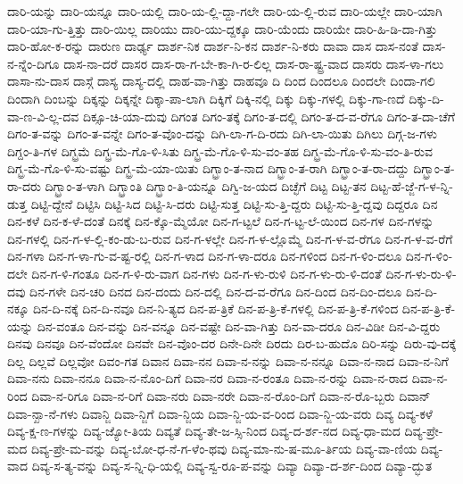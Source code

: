 {ದಾರಿ-ಯನ್ನು
ದಾರಿ-ಯನ್ನೂ
ದಾರಿ-ಯಲ್ಲಿ
ದಾರಿ-ಯ-ಲ್ಲಿ-ದ್ದಾ-ಗಲೇ
ದಾರಿ-ಯ-ಲ್ಲಿ-ರುವ
ದಾರಿ-ಯಲ್ಲೇ
ದಾರಿ-ಯಾಗಿ
ದಾರಿ-ಯಾ-ಗು-ತ್ತಿತ್ತು
ದಾರಿ-ಯಿಲ್ಲ
ದಾರಿಯು
ದಾರಿ-ಯು-ದ್ದಕ್ಕೂ
ದಾರಿ-ಯೆಂದು
ದಾರಿಯೇ
ದಾರಿ-ಹಿ-ಡಿ-ದಾ-ಗಿತ್ತು
ದಾರಿ-ಹೋ-ಕ-ರನ್ನು
ದಾರುಣ
ದಾರ್ಢ್ಯ
ದಾರ್ಶ-ನಿಕ
ದಾರ್ಶ-ನಿ-ಕನ
ದಾರ್ಶ-ನಿ-ಕರು
ದಾವಾ
ದಾಸ
ದಾಸ-ನಂತೆ
ದಾಸ-ನ-ನ್ನೆಂ-ದಿಗೂ
ದಾಸ-ನಾ-ದರೆ
ದಾಸರ
ದಾಸ-ರಾ-ಗ-ಬೇ-ಕಾ-ಗಿ-ರ-ಲಿಲ್ಲ
ದಾಸ-ರಾ-ಷ್ಟ್ರ-ವಾದ
ದಾಸರು
ದಾಸ-ಳಾ-ಗಲು
ದಾಸಾ-ನು-ದಾಸ
ದಾಸ್ಗೆ
ದಾಸ್ಯ
ದಾಸ್ಯ-ದಲ್ಲಿ
ದಾಹ-ವಾ-ಗಿತ್ತು
ದಾಹವೂ
ದಿ
ದಿಂದ
ದಿಂದಲೂ
ದಿಂದಲೇ
ದಿಂದಾ-ಗಲಿ
ದಿಂದಾಗಿ
ದಿಂಬನ್ನು
ದಿಕ್ಕನ್ನು
ದಿಕ್ಕನ್ನೇ
ದಿಕ್ಕಾ-ಪಾ-ಲಾಗಿ
ದಿಕ್ಕಿಗೆ
ದಿಕ್ಕಿ-ನಲ್ಲಿ
ದಿಕ್ಕು
ದಿಕ್ಕು-ಗಳಲ್ಲಿ
ದಿಕ್ಕು-ಗಾ-ಣದೆ
ದಿಕ್ಕು-ದಿ-ವಾ-ಣ-ವಿ-ಲ್ಲ-ದವ
ದಿಕ್ಸೂ-ಚಿ-ಯಾ-ದುವು
ದಿಗಂತ
ದಿಗಂ-ತಕ್ಕೆ
ದಿಗಂ-ತ-ದಲ್ಲಿ
ದಿಗಂ-ತ-ದ-ವ-ರೆಗೂ
ದಿಗಂ-ತ-ದಾ-ಚೆಗೆ
ದಿಗಂ-ತ-ವನ್ನು
ದಿಗಂ-ತ-ವನ್ನೇ
ದಿಗಂ-ತ-ವೊಂ-ದನ್ನು
ದಿಗಿ-ಲಾ-ಗ-ದಿ-ರದು
ದಿಗಿ-ಲಾ-ಯಿತು
ದಿಗಿಲು
ದಿಗ್ಗ-ಜ-ಗಳು
ದಿಗ್ದಂ-ತಿ-ಗಳ
ದಿಗ್ಭ್ರಮೆ
ದಿಗ್ಭ್ರ-ಮೆ-ಗೊ-ಳಿ-ಸಿತು
ದಿಗ್ಭ್ರ-ಮೆ-ಗೊ-ಳಿ-ಸು-ವಂ-ತಹ
ದಿಗ್ಭ್ರ-ಮೆ-ಗೊ-ಳಿ-ಸು-ವಂ-ತಿ-ರುವ
ದಿಗ್ಭ್ರ-ಮೆ-ಗೊ-ಳಿ-ಸು-ವಷ್ಟು
ದಿಗ್ಭ್ರ-ಮೆ-ಯಾ-ಯಿತು
ದಿಗ್ಭ್ರಾಂ-ತ-ನಾದ
ದಿಗ್ಭ್ರಾಂ-ತ-ರಾಗಿ
ದಿಗ್ಭ್ರಾಂ-ತ-ರಾ-ದದ್ದು
ದಿಗ್ಭ್ರಾಂ-ತ-ರಾ-ದರು
ದಿಗ್ಭ್ರಾಂ-ತ-ಳಾಗಿ
ದಿಗ್ಭ್ರಾಂತಿ
ದಿಗ್ಭ್ರಾಂ-ತಿ-ಯನ್ನೂ
ದಿಗ್ವಿ-ಜ-ಯದ
ದಿಚ್ಛೆಗೆ
ದಿಟ್ಟ
ದಿಟ್ಟ-ತನ
ದಿಟ್ಟ-ಹೆ-ಜ್ಜೆ-ಗ-ಳ-ನ್ನಿ-ಡುತ್ತ
ದಿಟ್ಟಿ-ದ್ದೇನೆ
ದಿಟ್ಟಿಸಿ
ದಿಟ್ಟಿ-ಸಿದ
ದಿಟ್ಟಿ-ಸಿ-ದರು
ದಿಟ್ಟಿ-ಸುತ್ತ
ದಿಟ್ಟಿ-ಸು-ತ್ತಿ-ದ್ದರು
ದಿಟ್ಟಿ-ಸು-ತ್ತಿ-ದ್ದವು
ದಿದ್ದರೂ
ದಿನ
ದಿನ-ಕಳೆ
ದಿನ-ಕ-ಳೆ-ದಂತೆ
ದಿನಕ್ಕೆ
ದಿನ-ಕ್ಕೊ-ಮ್ಮೆಯೋ
ದಿನ-ಗ-ಟ್ಟಲೆ
ದಿನ-ಗ-ಟ್ಟ-ಲೆ-ಯಿಂದ
ದಿನ-ಗಳ
ದಿನ-ಗಳನ್ನು
ದಿನ-ಗಳಲ್ಲಿ
ದಿನ-ಗ-ಳ-ಲ್ಲಿ-ಕಂ-ಡು-ಬ-ರುವ
ದಿನ-ಗ-ಳಲ್ಲೇ
ದಿನ-ಗ-ಳ-ಲ್ಲೊಮ್ಮೆ
ದಿನ-ಗ-ಳ-ವ-ರೆಗೂ
ದಿನ-ಗ-ಳ-ವ-ರೆಗೆ
ದಿನ-ಗಳಾ
ದಿನ-ಗ-ಳಾ-ಗು-ವ-ಷ್ಟ-ರಲ್ಲಿ
ದಿನ-ಗ-ಳಾದ
ದಿನ-ಗ-ಳಾ-ದರೂ
ದಿನ-ಗಳಿಂದ
ದಿನ-ಗ-ಳಿಂ-ದಲೂ
ದಿನ-ಗ-ಳಿಂ-ದಲೇ
ದಿನ-ಗ-ಳಿ-ಗಂತೂ
ದಿನ-ಗ-ಳಿ-ರು-ವಾಗ
ದಿನ-ಗಳು
ದಿನ-ಗ-ಳು-ರುಳಿ
ದಿನ-ಗ-ಳು-ರು-ಳಿ-ದಂತೆ
ದಿನ-ಗ-ಳು-ರು-ಳಿ-ದವು
ದಿನ-ಗಳೇ
ದಿನ-ಚರಿ
ದಿನದ
ದಿನ-ದಂದು
ದಿನ-ದಲ್ಲಿ
ದಿನ-ದ-ವ-ರೆಗೂ
ದಿನ-ದಿಂದ
ದಿನ-ದಿಂ-ದಲೂ
ದಿನ-ದಿ-ನಕ್ಕೂ
ದಿನ-ದಿ-ನಕ್ಕೆ
ದಿನ-ದಿ-ನವೂ
ದಿನ-ನಿ-ತ್ಯದ
ದಿನ-ಪ-ತ್ರಿಕೆ
ದಿನ-ಪ-ತ್ರಿ-ಕೆ-ಗಳಲ್ಲಿ
ದಿನ-ಪ-ತ್ರಿ-ಕೆ-ಗಳಿಂದ
ದಿನ-ಪ-ತ್ರಿ-ಕೆ-ಯನ್ನು
ದಿನ-ವಂತೂ
ದಿನ-ವನ್ನು
ದಿನ-ವನ್ನೂ
ದಿನ-ವಷ್ಟೇ
ದಿನ-ವಾ-ಗಿತ್ತು
ದಿನ-ವಾ-ದರೂ
ದಿನ-ವಿಡೀ
ದಿನ-ವಿ-ದ್ದರು
ದಿನವು
ದಿನವೂ
ದಿನ-ವೆಂದೋ
ದಿನವೇ
ದಿನ-ವೊಂ-ದರ
ದಿನೇ-ದಿನೇ
ದಿರದು
ದಿರ-ಬ-ಹುದೊ
ದಿರಿ-ಸನ್ನು
ದಿರು-ವು-ದಕ್ಕೆ
ದಿಲ್ಲ
ದಿಲ್ಲವೆ
ದಿಲ್ಲವೋ
ದಿವಂ-ಗತ
ದಿವಾನ
ದಿವಾ-ನನ
ದಿವಾ-ನ-ನನ್ನು
ದಿವಾ-ನ-ನನ್ನೂ
ದಿವಾ-ನ-ನಾದ
ದಿವಾ-ನ-ನಿಗೆ
ದಿವಾ-ನನು
ದಿವಾ-ನನೂ
ದಿವಾ-ನ-ನೊಂ-ದಿಗೆ
ದಿವಾ-ನರ
ದಿವಾ-ನ-ರಂತೂ
ದಿವಾ-ನ-ರನ್ನು
ದಿವಾ-ನ-ರಾದ
ದಿವಾ-ನ-ರಿಂದ
ದಿವಾ-ನ-ರಿಗೂ
ದಿವಾ-ನ-ರಿಗೆ
ದಿವಾ-ನರು
ದಿವಾ-ನರೇ
ದಿವಾ-ನ-ರೊಂ-ದಿಗೆ
ದಿವಾ-ನ-ರೊ-ಬ್ಬರು
ದಿವಾನ್
ದಿವಾ-ನ್ಖಾ-ನೆ-ಗಳು
ದಿವಾನ್ಜಿ
ದಿವಾ-ನ್ಜಿಗೆ
ದಿವಾ-ನ್ಜಿಯ
ದಿವಾ-ನ್ಜಿ-ಯ-ವ-ರಿಂದ
ದಿವಾ-ನ್ಜಿ-ಯ-ವರು
ದಿವ್ಯ
ದಿವ್ಯ-ಕಳೆ
ದಿವ್ಯ-ಕ್ಷ-ಣ-ಗಳನ್ನು
ದಿವ್ಯ-ಜ್ಯೋ-ತಿಯ
ದಿವ್ಯತೆ
ದಿವ್ಯ-ತೇ-ಜ-ಸ್ಸಿ-ನಿಂದ
ದಿವ್ಯ-ದ-ರ್ಶ-ನದ
ದಿವ್ಯ-ಧಾ-ಮದ
ದಿವ್ಯ-ಪ್ರೇ-ಮದ
ದಿವ್ಯ-ಪ್ರೇ-ಮ-ವನ್ನು
ದಿವ್ಯ-ಬೋ-ಧ-ನೆ-ಗ-ಳೆಂ-ಥವು
ದಿವ್ಯ-ಮಾ-ನು-ಷ-ಮೂ-ರ್ತಿಯ
ದಿವ್ಯ-ವಾ-ಣಿಯ
ದಿವ್ಯ-ವಾದ
ದಿವ್ಯ-ಸ-ತ್ಯ-ವನ್ನು
ದಿವ್ಯ-ಸ-ನ್ನಿ-ಧಿ-ಯಲ್ಲಿ
ದಿವ್ಯ-ಸ್ವ-ರೂ-ಪ-ವನ್ನು
ದಿವ್ಯಾ
ದಿವ್ಯಾ-ದ-ರ್ಶ-ದಿಂದ
ದಿವ್ಯಾ-ದ್ಭುತ
}
